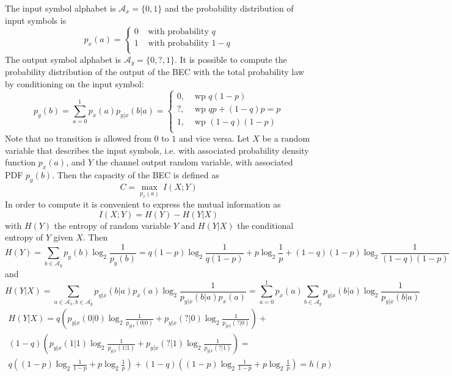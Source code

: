 \documentclass[10pt]{article}
\begin{document}
The input symbol alphabet is $\mathcal{A}_x = \{0,1\}$ and the probability distribution of input symbols is
\begin{equation}
	p_x(a) = 
	\begin{cases}
		0 & \mbox{ with probability } q \\
		1 & \mbox{ with probability } 1- q \\
	\end{cases}
\end{equation}
The output symbol alphabet is $\mathcal{A}_y = \{0,?,1\}$. It is possible to compute the probability distribution of the output of the BEC with the total probability law by conditioning on the input symbol:
\begin{equation}
	p_y(b) = \sum_{a= 0}^1 p_x(a) p_{y|x}(b|a) = 
	\begin{cases}
		0, &\text{ wp } q(1-p)\\
		?, &\text{ wp } qp + (1-q)p = p\\
		1, &\text{ wp } (1-q)(1-p)\\
	\end{cases}
\end{equation}
Note that no transition is allowed from $0$ to $1$ and vice versa. Let $X$ be a random variable that describes the input symbols, i.e. with associated probability density function $p_x(a)$, and $Y$ the channel output random variable, with associated PDF $p_y(b)$. Then the capacity of the BEC is defined as
\begin{equation}
	C = \max_{p_x(a)} \, I(X;Y)
\end{equation}
In order to compute it is convenient to express the mutual information as
\begin{equation}
	I(X;Y) = H(Y) - H(Y|X)
\end{equation}
with $H(Y)$ the entropy of random variable $Y$ and $H(Y|X)$ the conditional entropy of $Y$ given $X$. Then
\begin{equation}
	H(Y) = \sum_{b\in\mathcal{A}_y} p_y(b) \log_2 \frac{1}{p_y(b)} = q(1-p)\log_2\frac{1}{q(1-p)} + p\log_2\frac{1}{p} + (1-q)(1-p)\log_2\frac{1}{(1-q)(1-p)}
\end{equation}
and
\begin{equation}
	H(Y|X) = \sum_{a\in\mathcal{A}_x, b\in\mathcal{A}_y} p_{y|x}(b|a)p_x(a)\log_2\frac{1}{p_{y|x}(b|a)p_x(a)} = \sum_{a=0}^1 p_x(a) \sum_{b\in\mathcal{A}_y}p_{y|x}(b|a)\log_2\frac{1}{p_{y|x}(b|a)}
\end{equation}
\begin{multline}\label{eq:hyx}
	H(Y|X) = q\left(p_{y|x}(0|0)\log_2\frac{1}{p_{y|x}(0|0)} + p_{y|x}(?|0)\log_2\frac{1}{p_{y|x}(?|0)}\right) + \\ (1-q)\left(p_{y|x}(1|1)\log_2\frac{1}{p_{y|x}(1|1)} + p_{y|x}(?|1)\log_2\frac{1}{p_{y|x}(?|1)}\right) = \\
	q\left((1-p)\log_2\frac{1}{1-p} + p\log_2\frac{1}{p} \right) + (1-q)\left((1-p)\log_2\frac{1}{1-p} + p\log_2\frac{1}{p}\right) = h(p)
\end{multline}
\end{document}
